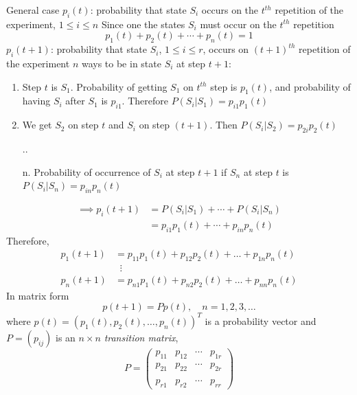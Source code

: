 \documentclass[aspectratio=169]{beamer}\usepackage[]{graphicx}\usepackage[]{xcolor}
\begin{document}
\begin{frame}{General case}
$p_i(t)$: probability that state $S_i$ occurs on the $t^{th}$ repetition of the experiment, $1\leq i\leq n$
\vfill
Since one the states $S_i$ must occur on the $t^{th}$ repetition
\[
p_1(t)+p_2(t)+\cdots+p_n(t)=1
\]
$p_i(t+1)$: probability that state $S_i$, $1\leq i\leq r$, occurs on $(t+1)^{th}$ repetition of the experiment
\vfill
$n$ ways to be in state $S_i$ at step $t+1$:
\begin{enumerate}
\item Step $t$ is $S_1$. Probability of getting $S_1$ on $t^{th}$ step is $p_1(t)$, and probability of having $S_i$ after $S_1$ is $p_{i1}$. Therefore $P(S_i|S_1)=p_{i1}p_1(t)$
\item We get $S_2$ on step $t$ and $S_i$ on step $(t+1)$. Then $P(S_i|S_2)=p_{2i}p_2(t)$
\item[..]
\item[n.] Probability of occurrence of $S_i$ at step $t+1$ if $S_n$ at step $t$ is $P(S_i|S_n)=p_{in}p_n(t)$
\end{enumerate}
\end{frame}


\begin{frame}
\begin{align*}
\implies
p_i(t+1) &= P(S_i|S_1)+\cdots+P(S_i|S_n) \\
&= p_{i1}p_1(t)+\cdots+p_{in}p_n(t)
\end{align*}
Therefore,
\begin{align*}
p_1(t+1) &= p_{11}p_1(t)+p_{12}p_2(t)+\dots+p_{1n}p_n(t) \\
& \;\;\vdots\\
p_n(t+1) &= p_{n1}p_1(t)+p_{n2}p_2(t)+\dots+p_{nn}p_n(t)
\end{align*}
\vfill
In matrix form
\[
p(t+1)=Pp(t), \quad n=1,2,3,\dots
\]
where $p(t)=(p_1(t),p_{2}(t),\dots , p_n(t))^T$ is a probability vector and $P=(p_{ij})$ is an $n\times n$ \emph{transition matrix},
\[
P=
\begin{pmatrix}
p_{11} & p_{12} & \cdots & p_{1r} \\
p_{21} & p_{22} & \cdots & p_{2r} \\
&&& \\
p_{r1} & p_{r2} & \cdots & p_{rr}
\end{pmatrix}
\]
\end{frame}
\end{document}
